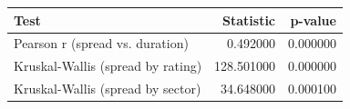 \begin{tabular}{lrr}
\toprule
Test & Statistic & p-value \\
\midrule
Pearson r (spread vs. duration) & 0.492000 & 0.000000 \\
Kruskal-Wallis (spread by rating) & 128.501000 & 0.000000 \\
Kruskal-Wallis (spread by sector) & 34.648000 & 0.000100 \\
\bottomrule
\end{tabular}
